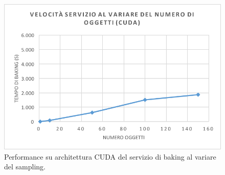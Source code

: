 \\
\begin{figure}[htb]
 \centering
 \includegraphics[width=0.8\linewidth]{images/chapter_prove_sperimentali/grafico2.png}\hfill
 \caption[Performance CUDA variando sampling]{Performance su architettura CUDA del servizio di baking al variare del sampling.}
 \label{fig:grafico4}
\end{figure} 

